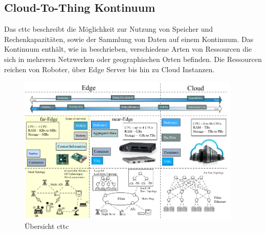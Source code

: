 \subsection{Cloud-To-Thing Kontinuum} %
\label{sub:Cloud-To-Thing-Continuum}

Das \acrlong{cttc} beschreibt die Möglichkeit zur Nutzung von Speicher und Rechenkapazitäten, sowie der Sammlung von Daten auf einem Kontinuum. Das Kontinuum enthält, wie in \cite{cominardiDevopsEdgeopsVision2021} beschrieben, verschiedene Arten von Ressourcen die sich in mehreren Netzwerken oder geographischen Orten befinden. Die Ressourcen reichen von Roboter, über Edge Server bis hin zu Cloud Instanzen.

\begin{figure}
  \begin{center}
    \includegraphics[width=0.95\textwidth]{./figures/cloud-thing-continuum.png}
  \end{center}
  \caption{Übersicht \acrlong{cttc} \cite{baldoniManagingFarEdgeAre2021}}
  \label{fig:cttc}
\end{figure}

